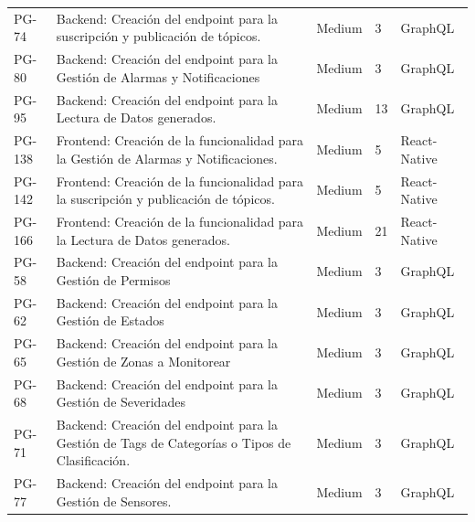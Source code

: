 \documentclass[11pt]{charter}
\begin{document}
\begin{tabularx}{\linewidth}{@{}p{1.3cm} p{14cm} p{1.7cm} p{1.5cm} p{2.5cm}@{}}
PG-74  & Backend: Creación del endpoint para la suscripción y publicación de tópicos.                           & Medium    & 3                          & GraphQL               \\
PG-80  & Backend: Creación del endpoint para la Gestión de Alarmas y Notificaciones                             & Medium    & 3                          & GraphQL               \\
PG-95  & Backend: Creación del endpoint para la Lectura de Datos generados.                                     & Medium    & 13                         & GraphQL               \\
PG-138 & Frontend: Creación de la funcionalidad para la Gestión de Alarmas y Notificaciones.                    & Medium    & 5                          & React-Native          \\
PG-142 & Frontend: Creación de la funcionalidad para la suscripción y publicación de tópicos.                   & Medium    & 5                          & React-Native          \\
PG-166 & Frontend: Creación de la funcionalidad para la Lectura de Datos generados.                             & Medium    & 21                         & React-Native          \\
PG-58  & Backend: Creación del endpoint para la Gestión de Permisos                                             & Medium    & 3                          & GraphQL               \\
PG-62  & Backend: Creación del endpoint para la Gestión de Estados                                              & Medium    & 3                          & GraphQL               \\
PG-65  & Backend: Creación del endpoint para la Gestión de Zonas a Monitorear                                   & Medium    & 3                          & GraphQL               \\
PG-68  & Backend: Creación del endpoint para la Gestión de Severidades                                          & Medium    & 3                          & GraphQL               \\
PG-71  & Backend: Creación del endpoint para la Gestión de Tags de Categorías o Tipos de Clasificación.         & Medium    & 3                          & GraphQL               \\
PG-77  & Backend: Creación del endpoint para la Gestión de Sensores.                                            & Medium    & 3                          & GraphQL               \\

\end{tabularx}
\end{document}

